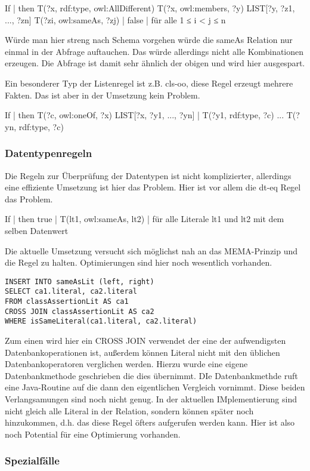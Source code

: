 If | then
T(?x, rdf:type, owl:AllDifferent)
T(?x, owl:members, ?y)
LIST[?y, ?z1, ..., ?zn]
T(?zi, owl:sameAs, ?zj) 	          | false 	| für alle 1 ≤ i < j ≤ n

Würde man hier streng nach Schema vorgehen würde die sameAs Relation nur einmal in der Abfrage auftauchen. Das würde allerdings nicht alle Kombinationen erzeugen. Die Abfrage ist damit sehr ähnlich der obigen und wird hier ausgespart.

Ein besonderer Typ der Listenregel ist z.B. cls-oo, diese Regel erzeugt mehrere Fakten. Das ist aber in der Umsetzung kein Problem.

If | then
T(?c, owl:oneOf, ?x)
LIST[?x, ?y1, ..., ?yn] 	 | T(?y1, rdf:type, ?c)
								...
								T(?yn, rdf:type, ?c) 

\subsubsection{Datentypenregeln}
Die Regeln zur Überprüfung der Datentypen ist nicht komplizierter, allerdings eine effiziente Umsetzung ist hier das Problem. Hier ist vor allem die dt-eq Regel das Problem.

If | then
true | T(lt1, owl:sameAs, lt2) | für alle Literale lt1 und lt2 mit dem selben Datenwert

Die aktuelle Umsetzung versucht sich möglichst nah an das MEMA-Prinzip und die Regel zu halten. Optimierungen sind hier noch wesentlich vorhanden.

\begin{lstlisting}
INSERT INTO sameAsLit (left, right)
SELECT ca1.literal, ca2.literal
FROM classAssertionLit AS ca1
CROSS JOIN classAssertionLit AS ca2
WHERE isSameLiteral(ca1.literal, ca2.literal)
\end{lstlisting}

Zum einen wird hier ein CROSS JOIN verwendet der eine der aufwendigsten Datenbankoperationen ist, außerdem können Literal nicht mit den üblichen Datenbankoperatoren verglichen werden. Hierzu wurde eine eigene Datenbankmethode geschrieben die dies übernimmt. DIe Datenbankmethde ruft eine Java-Routine auf die dann den eigentlichen Vergleich vornimmt. Diese beiden Verlangsamungen sind noch nicht genug. In der aktuellen IMplementierung sind nicht gleich alle Literal in der Relation, sondern können später noch hinzukommen, d.h. das diese Regel öfters aufgerufen werden kann. Hier ist also noch Potential für eine Optimierung vorhanden.


\subsubsection{Spezialfälle} 
 